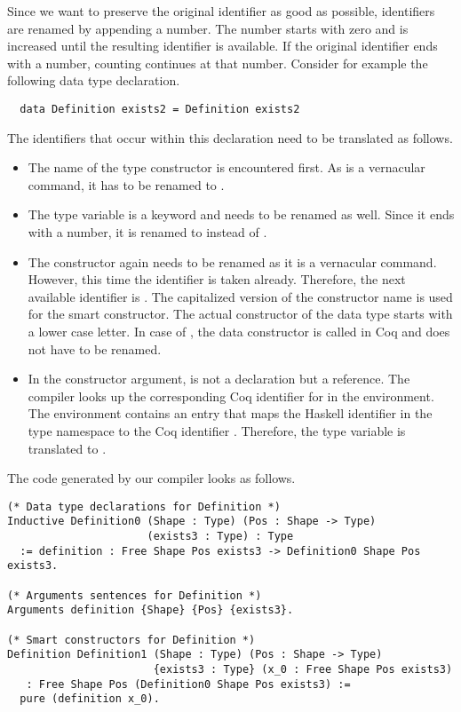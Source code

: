 Since we want to preserve the original identifier as good as possible, identifiers are renamed by appending a number.
The number starts with zero and is increased until the resulting identifier is available.
If the original identifier ends with a number, counting continues at that number.
Consider for example the following data type declaration.
\begin{verbatim}
  data Definition exists2 = Definition exists2
\end{verbatim}
The identifiers that occur within this declaration need to be translated as follows.
\begin{itemize}
  \item
  The name of the type constructor is encountered first.
  As  is a vernacular command, it has to be renamed to .

  \item
  The type variable  is a keyword and needs to be renamed as well.
  Since it ends with a number, it is renamed to  instead of .

  \item
  The constructor  again needs to be renamed as it is a vernacular command.
  However, this time the identifier  is taken already.
  Therefore, the next available identifier is .
  The capitalized version of the constructor name is used for the smart constructor.
  The actual constructor of the data type starts with a lower case letter.
  In case of , the data constructor is called  in Coq and does not have to be renamed.

  \item
  In the constructor argument,  is not a declaration but a reference.
  The compiler looks up the corresponding Coq identifier for  in the environment.
  The environment contains an entry that maps the Haskell identifier  in the type namespace to the Coq identifier .
  Therefore, the type variable is translated to .
\end{itemize}
The code generated by our compiler looks as follows.
\begin{verbatim}
(* Data type declarations for Definition *)
Inductive Definition0 (Shape : Type) (Pos : Shape -> Type)
                      (exists3 : Type) : Type
  := definition : Free Shape Pos exists3 -> Definition0 Shape Pos exists3.

(* Arguments sentences for Definition *)
Arguments definition {Shape} {Pos} {exists3}.

(* Smart constructors for Definition *)
Definition Definition1 (Shape : Type) (Pos : Shape -> Type)
                       {exists3 : Type} (x_0 : Free Shape Pos exists3)
   : Free Shape Pos (Definition0 Shape Pos exists3) :=
  pure (definition x_0).
\end{verbatim}

